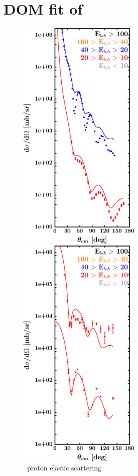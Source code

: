 \section{DOM fit of \snTwelve}
\label{sn112DOMOutput}
\begin{figure}[hbtp]
    \centering
    \begin{minipage}{0.47\textwidth}
        \centering
        \includegraphics[width=0.52\textwidth]{figures/sn112_protonElastic.png}
        \caption*{\snTwelve\ proton elastic scattering}
        \label{DOMFitData_sn112_proton_elastic}
    \end{minipage}\hspace{6pt}
    \begin{minipage}{0.47\textwidth}
        \centering
        \includegraphics[width=0.52\textwidth]{figures/sn112_neutronElastic.png}

\end{minipage}
\end{figure}
